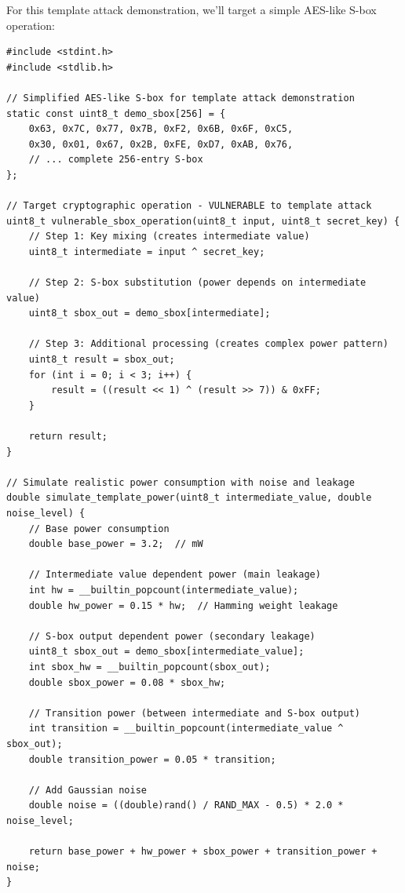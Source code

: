 \documentclass[11pt,a4paper]{article}
\theoremstyle{definition}
\begin{document}
For this template attack demonstration, we'll target a simple AES-like S-box operation:

\begin{lstlisting}[caption={Template Attack Target Implementation}]
#include <stdint.h>
#include <stdlib.h>

// Simplified AES-like S-box for template attack demonstration
static const uint8_t demo_sbox[256] = {
    0x63, 0x7C, 0x77, 0x7B, 0xF2, 0x6B, 0x6F, 0xC5,
    0x30, 0x01, 0x67, 0x2B, 0xFE, 0xD7, 0xAB, 0x76,
    // ... complete 256-entry S-box
};

// Target cryptographic operation - VULNERABLE to template attack
uint8_t vulnerable_sbox_operation(uint8_t input, uint8_t secret_key) {
    // Step 1: Key mixing (creates intermediate value)
    uint8_t intermediate = input ^ secret_key;
    
    // Step 2: S-box substitution (power depends on intermediate value)
    uint8_t sbox_out = demo_sbox[intermediate];
    
    // Step 3: Additional processing (creates complex power pattern)
    uint8_t result = sbox_out;
    for (int i = 0; i < 3; i++) {
        result = ((result << 1) ^ (result >> 7)) & 0xFF;
    }
    
    return result;
}

// Simulate realistic power consumption with noise and leakage
double simulate_template_power(uint8_t intermediate_value, double noise_level) {
    // Base power consumption
    double base_power = 3.2;  // mW
    
    // Intermediate value dependent power (main leakage)
    int hw = __builtin_popcount(intermediate_value);
    double hw_power = 0.15 * hw;  // Hamming weight leakage
    
    // S-box output dependent power (secondary leakage)
    uint8_t sbox_out = demo_sbox[intermediate_value];
    int sbox_hw = __builtin_popcount(sbox_out);
    double sbox_power = 0.08 * sbox_hw;
    
    // Transition power (between intermediate and S-box output)
    int transition = __builtin_popcount(intermediate_value ^ sbox_out);
    double transition_power = 0.05 * transition;
    
    // Add Gaussian noise
    double noise = ((double)rand() / RAND_MAX - 0.5) * 2.0 * noise_level;
    
    return base_power + hw_power + sbox_power + transition_power + noise;
}
\end{lstlisting}
\end{document}
